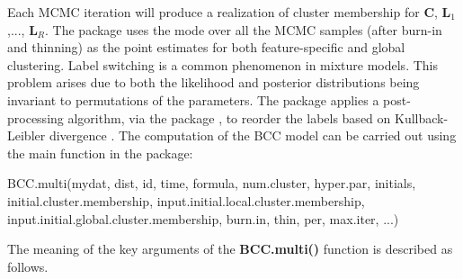 Each MCMC iteration will produce a realization of cluster membership for $\boldsymbol{C}$, $\boldsymbol{L}_1$,..., $\boldsymbol{L}_R$. The package uses the mode over all the MCMC samples (after burn-in and thinning) as the point estimates for both feature-specific and global clustering. 
Label switching is a common phenomenon in mixture models. This problem arises due to both the likelihood and posterior distributions being invariant to permutations of the parameters. The  package applies a post-processing algorithm, via the  package \citep{Papastamoulis2016}, to reorder the labels based on Kullback-Leibler divergence \citep{Stephens2000}.
The computation of the BCC model can be carried out using the main function in the   package: 
\begin{example}
BCC.multi(mydat, dist, id, time, formula, num.cluster,  
		 hyper.par, initials, initial.cluster.membership, 
		 input.initial.local.cluster.membership, 
		 input.initial.global.cluster.membership,
		 burn.in, thin, per, max.iter, ...)
\end{example}
The meaning of the key arguments of the \textbf{BCC.multi()} function is described as follows. 
